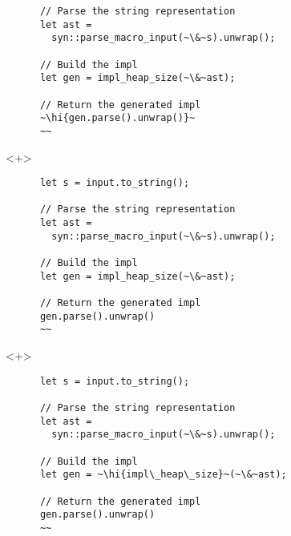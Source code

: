 \documentclass[usepdftitle=false]{beamer}
\renewcommand{\&}{\makebox[\widthof{\ampersand}][c]{\scalebox{0.9}[1.0]{\Book\ampersand}}}
\newcommand{\+}{\makebox[\widthof{+}][c]{\raisebox{-.2\height}{\scalefont{1.5}\Light+}}}
\newcommand{\hi}[1]{%
\tikz[baseline=(A.base)]
 \node[highlighting=0,inner sep=0pt,text depth=0pt] (A) {#1};%
}
\begin{document}
\begin{frame}[fragile]
\begin{onlyenv}
\begin{verbatim}
      // Parse the string representation
      let ast =
        syn::parse_macro_input(~\&~s).unwrap();

      // Build the impl
      let gen = impl_heap_size(~\&~ast);

      // Return the generated impl
      ~\hi{gen.parse().unwrap()}~
      ~~
    \end{verbatim}
  \end{onlyenv}
  \begin{onlyenv}<+>
    \begin{verbatim}
      let s = input.to_string();

      // Parse the string representation
      let ast =
        syn::parse_macro_input(~\&~s).unwrap();

      // Build the impl
      let gen = impl_heap_size(~\&~ast);

      // Return the generated impl
      gen.parse().unwrap()
      ~~
    \end{verbatim}
  \end{onlyenv}
  \begin{onlyenv}<+>
    \begin{verbatim}
      let s = input.to_string();

      // Parse the string representation
      let ast =
        syn::parse_macro_input(~\&~s).unwrap();

      // Build the impl
      let gen = ~\hi{impl\_heap\_size}~(~\&~ast);

      // Return the generated impl
      gen.parse().unwrap()
      ~~
    \end{verbatim}
  \end{onlyenv}
\end{frame}
\end{document}
